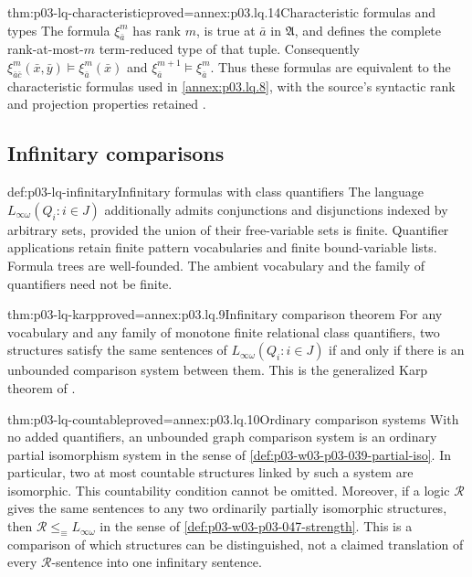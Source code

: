 \begin{hbtheorem}{thm:p03-lq-characteristic}{proved=annex:p03.lq.14}{Characteristic formulas and types}
The formula \(\xi^m_{\bar a}\) has rank \(m\), is true at
\(\bar a\) in \(\mathfrak A\), and defines the complete
rank-at-most-\(m\) term-reduced type of that tuple.
Consequently
\(\xi^m_{\bar a\bar c}(\bar x,\bar y)\models\xi^m_{\bar a}(\bar x)\)
and
\(\xi^{m+1}_{\bar a}\models\xi^m_{\bar a}\).
Thus these formulas are equivalent to the characteristic formulas
used in \cref{annex:p03.lq.8}, with the source's syntactic rank and
projection properties retained
\cite[Ch.~II, Lemma~4.2.6, p.~56]{Ebbinghaus1985ExtendedLogics}.
\end{hbtheorem}

\subsection{Infinitary comparisons}

\begin{hbdefinition}{def:p03-lq-infinitary}{Infinitary formulas with class quantifiers}
The language \(L_{\infty\omega}(Q_i:i\in J)\) additionally admits
conjunctions and disjunctions indexed by arbitrary sets, provided the
union of their free-variable sets is finite. Quantifier applications
retain finite pattern vocabularies and finite bound-variable lists.
Formula trees are well-founded. The ambient vocabulary and the
family of quantifiers need not be finite.
\end{hbdefinition}

\begin{hbtheorem}{thm:p03-lq-karp}{proved=annex:p03.lq.9}{Infinitary comparison theorem}
For any vocabulary and any family of monotone finite relational
class quantifiers, two structures satisfy the same sentences of
\(L_{\infty\omega}(Q_i:i\in J)\) if and only if there is an
unbounded comparison system between them. This is the generalized
Karp theorem of \cite[Ch.~II, Theorem~4.3.3,
p.~59]{Ebbinghaus1985ExtendedLogics}.
\end{hbtheorem}

\begin{hbcorollary}{thm:p03-lq-countable}{proved=annex:p03.lq.10}{Ordinary comparison systems}
With no added quantifiers, an unbounded graph comparison system is
an ordinary partial isomorphism system in the sense of
\cref{def:p03-w03-p03-039-partial-iso}. In particular, two at most
countable structures linked by such a system are isomorphic.
This countability condition cannot be omitted.
Moreover, if a logic \(\mathscr R\) gives the same sentences to any
two ordinarily partially isomorphic structures, then
\(\mathscr R\leq_{\equiv}L_{\infty\omega}\) in the sense of
\cref{def:p03-w03-p03-047-strength}. This is a comparison of
which structures can be distinguished, not a claimed translation
of every \(\mathscr R\)-sentence into one infinitary sentence.
\end{hbcorollary}

